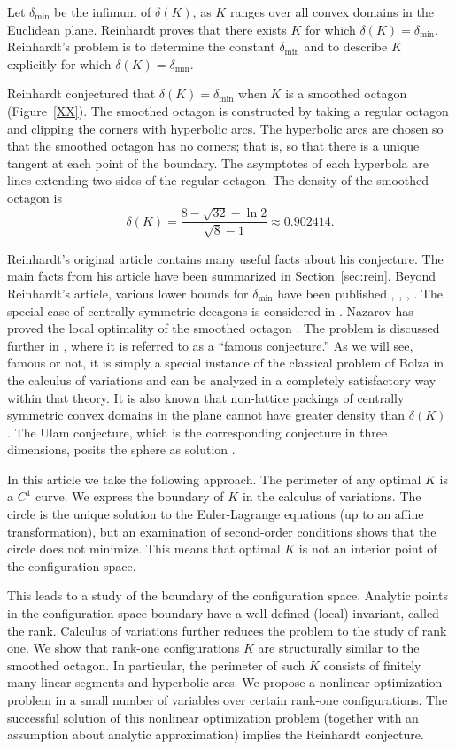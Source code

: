 \documentclass[11pt]{amsart}
\def\deltalat{\mathbb\delta}  %
\def\delt{\delta_{\min}}
\begin{document}
Let $\delt$ be the infimum of $\deltalat(K)$,
as $K$ ranges over all convex domains in the Euclidean plane.  
Reinhardt proves that there exists $K$ for which $\deltalat(K)=\delt$.
Reinhardt's problem
is to determine the constant $\delt$ and 
to  describe $K$ explicitly
for which $\deltalat(K)=\delt$.

Reinhardt conjectured that $\deltalat(K) =\delt$ when $K$ is a
smoothed octagon (Figure~\ref{XX}).   The smoothed octagon is constructed
by taking a regular octagon and clipping the corners with hyperbolic arcs.
The hyperbolic arcs are chosen so that the smoothed octagon has no corners; that is, so that there is a unique tangent at each point of the boundary.  The asymptotes of each hyperbola are lines extending two sides of the regular octagon.  The density of the smoothed octagon is
   $$\deltalat(K) = \frac{8 - \sqrt{32} - \ln{2}}{\sqrt8 - 1}\approx 0.902414.$$

Reinhardt's original article contains many useful facts about his conjecture.  The main facts
from his article have been summarized in Section~\ref{sec:rein}.  Beyond Reinhardt's article,
various lower bounds for $\delt$ have been published \cite{MH}, \cite{FT}, \cite{T}, \cite{E}.
The special case of centrally symmetric decagons is considered in \cite{LM}.  
Nazarov has proved the local optimality of the smoothed octagon \cite{N}. The problem is discussed further in \cite{AP}, where it is referred to as a ``famous conjecture.''  As we will see, famous or not, it is simply a special instance of the classical problem of Bolza in the calculus of variations and can be analyzed in a completely satisfactory way within that theory.   It is also known that non-lattice packings of centrally symmetric convex domains in the plane cannot have greater density than $\deltalat(K)$ \cite{FT50}.  The Ulam conjecture, which is the corresponding conjecture in three dimensions, posits the sphere as solution \cite{G}.  

In this article we take the following approach.  The perimeter of any optimal $K$ is a $C^1$ curve.
We express the boundary of $K$ in the calculus of variations. The circle is the unique solution to the Euler-Lagrange equations (up to an affine transformation), but an examination of second-order conditions shows that the circle does not minimize.  This means that optimal $K$ is not an interior point of the configuration space.


This leads to a study of the boundary of the configuration space.  Analytic points in the configuration-space boundary have a well-defined (local) invariant, called the rank.  Calculus of variations further reduces the problem to the study of rank one.  We show that rank-one configurations $K$ are structurally similar to the smoothed octagon.  In particular, the perimeter of such $K$ consists of finitely many linear segments and hyperbolic arcs.  We propose a nonlinear optimization problem in a small number of variables over certain rank-one configurations.  The successful solution of this nonlinear optimization problem (together with an assumption about analytic approximation)
implies the Reinhardt conjecture. 
\end{document}

